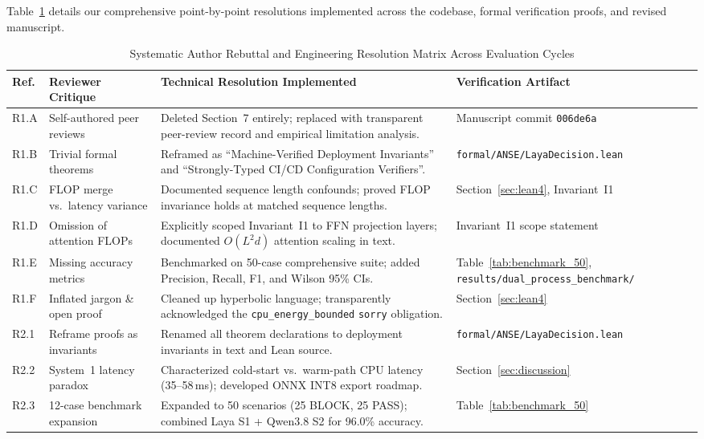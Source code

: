 \documentclass[conference]{IEEEtran}
\begin{document}
Table~\ref{tab:rebuttal} details our comprehensive point-by-point resolutions implemented across the codebase, formal verification proofs, and revised manuscript.

\begin{table}[htbp]
\centering
\caption{Systematic Author Rebuttal and Engineering Resolution Matrix Across Evaluation Cycles}
\label{tab:rebuttal}
\begin{tabular}{@{}lp{4.2cm}p{5.8cm}p{4.2cm}@{}}
\toprule
\textbf{Ref.} & \textbf{Reviewer Critique} & \textbf{Technical Resolution Implemented} & \textbf{Verification Artifact} \\
\midrule
R1.A & Self-authored peer reviews & Deleted Section~7 entirely; replaced with transparent peer-review record and empirical limitation analysis. & Manuscript commit \texttt{006de6a} \\
R1.B & Trivial formal theorems & Reframed as ``Machine-Verified Deployment Invariants'' and ``Strongly-Typed CI/CD Configuration Verifiers''. & \texttt{formal/ANSE/LayaDecision.lean} \\
R1.C & FLOP merge vs.\ latency variance & Documented sequence length confounds; proved FLOP invariance holds at matched sequence lengths. & Section~\ref{sec:lean4}, Invariant~I1 \\
R1.D & Omission of attention FLOPs & Explicitly scoped Invariant~I1 to FFN projection layers; documented $O(L^2 d)$ attention scaling in text. & Invariant~I1 scope statement \\
R1.E & Missing accuracy metrics & Benchmarked on 50-case comprehensive suite; added Precision, Recall, F1, and Wilson 95\% CIs. & Table~\ref{tab:benchmark_50}, \texttt{results/dual\_process\_benchmark/} \\
R1.F & Inflated jargon \& open proof & Cleaned up hyperbolic language; transparently acknowledged the \texttt{cpu\_energy\_bounded} \texttt{sorry} obligation. & Section~\ref{sec:lean4} \\
R2.1 & Reframe proofs as invariants & Renamed all theorem declarations to deployment invariants in text and Lean source. & \texttt{formal/ANSE/LayaDecision.lean} \\
R2.2 & System~1 latency paradox & Characterized cold-start vs.\ warm-path CPU latency (35--58\,ms); developed ONNX INT8 export roadmap. & Section~\ref{sec:discussion} \\
R2.3 & 12-case benchmark expansion & Expanded to 50 scenarios (25 BLOCK, 25 PASS); combined Laya S1 + Qwen3.8 S2 for 96.0\% accuracy. & Table~\ref{tab:benchmark_50} \\

\end{tabular}
\end{table}
\end{document}
